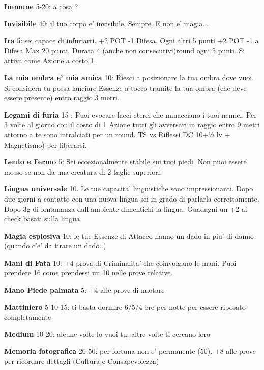\documentclass[a4paper,11pt,twoside,openany]{dndbook}
\begin{document}
\textbf{Immune} 5-20: a cosa ?

\textbf{Invisibile} 40: il tuo corpo e' invisibile. Sempre. E non e' magia...

\textbf{Ira} 5: sei capace di infuriarti. +2 POT -1 Difesa. Ogni altri 5 punti +2 POT -1 a Difesa Max 20 punti. Durata 4 (anche non consecutivi)round ogni 5 punti. Si attiva come Azione a costo 1.

\textbf{La mia ombra e' mia amica} 10: Riesci a posizionare la tua ombra dove vuoi. Si considera tu possa lanciare Essenze a tocco tramite la tua ombra (che deve essere presente) entro raggio 3 metri.

\textbf{Legami di furia} 15 : Puoi evocare lacci eterei che minacciano i tuoi nemici. Per 3 volte al giorno con il costo di 1 Azione tutti gli avversari in raggio entro 9 metri attorno a te sono intralciati per un round. TS vs Riflessi DC 10+½ lv + Magnetismo) per liberarsi.

\textbf{Lento e Fermo} 5: Sei eccezionalmente stabile sui tuoi piedi. Non puoi essere mosso se non da una creatura di 2 taglie superiori.

\textbf{Lingua universale} 10. Le tue capacita' linguistiche sono impressionanti. Dopo due giorni a contatto con una nuova lingua sei in grado di parlarla correttamente. Dopo 3g di lontananza dall'ambiente dimentichi la lingua. Guadagni un +2 ai check basati sulla lingua

\textbf{Magia esplosiva} 10: le tue Essenze di Attacco hanno un dado in piu' di danno (quando c'e' da tirare un dado..)

\textbf{Mani di Fata} 10: +4 prova di Criminalita' che coinvolgano le mani. Puoi prendere 16 come prendessi un 10 nelle prove relative. 

\textbf{Mano Piede palmata} 5: +4 alle prove di nuotare

\textbf{Mattiniero} 5-10-15: ti basta dormire 6/5/4 ore per notte
per essere riposato completamente

\textbf{Medium} 10-20: alcune volte lo vuoi tu, altre volte ti cercano loro

\textbf{Memoria fotografica} 20-50: per fortuna non e' permanente (50). +8 alle prove per ricordare dettagli (Cultura e Consapevolezza)
\end{document}
